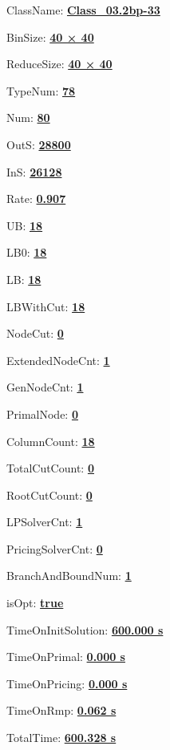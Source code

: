 \documentclass[11pt]{article}
\begin{document}
\pagestyle{empty}


ClassName: \underline{\textbf{Class_03.2bp-33}}
\par
BinSize: \underline{\textbf{40 × 40}}
\par
ReduceSize: \underline{\textbf{40 × 40}}
\par
TypeNum: \underline{\textbf{78}}
\par
Num: \underline{\textbf{80}}
\par
OutS: \underline{\textbf{28800}}
\par
InS: \underline{\textbf{26128}}
\par
Rate: \underline{\textbf{0.907}}
\par
UB: \underline{\textbf{18}}
\par
LB0: \underline{\textbf{18}}
\par
LB: \underline{\textbf{18}}
\par
LBWithCut: \underline{\textbf{18}}
\par
NodeCut: \underline{\textbf{0}}
\par
ExtendedNodeCnt: \underline{\textbf{1}}
\par
GenNodeCnt: \underline{\textbf{1}}
\par
PrimalNode: \underline{\textbf{0}}
\par
ColumnCount: \underline{\textbf{18}}
\par
TotalCutCount: \underline{\textbf{0}}
\par
RootCutCount: \underline{\textbf{0}}
\par
LPSolverCnt: \underline{\textbf{1}}
\par
PricingSolverCnt: \underline{\textbf{0}}
\par
BranchAndBoundNum: \underline{\textbf{1}}
\par
isOpt: \underline{\textbf{true}}
\par
TimeOnInitSolution: \underline{\textbf{600.000 s}}
\par
TimeOnPrimal: \underline{\textbf{0.000 s}}
\par
TimeOnPricing: \underline{\textbf{0.000 s}}
\par
TimeOnRmp: \underline{\textbf{0.062 s}}
\par
TotalTime: \underline{\textbf{600.328 s}}
\par
\newpage


\end{document}
